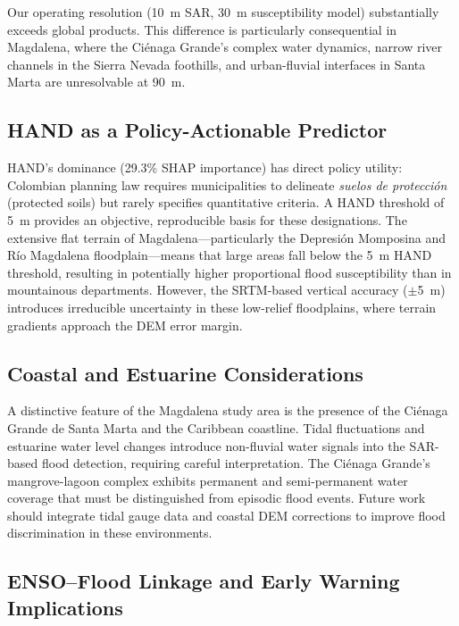 \documentclass{article}
\begin{document}
Our operating resolution (\SI{10}{\metre} SAR, \SI{30}{\metre} susceptibility model) substantially exceeds global products. This difference is particularly consequential in Magdalena, where the Ci\'enaga Grande's complex water dynamics, narrow river channels in the Sierra Nevada foothills, and urban-fluvial interfaces in Santa Marta are unresolvable at \SI{90}{\metre}.

\subsection{HAND as a Policy-Actionable Predictor}

HAND's dominance (29.3\% SHAP importance) has direct policy utility: Colombian planning law requires municipalities to delineate \textit{suelos de protecci\'on} (protected soils) but rarely specifies quantitative criteria. A HAND threshold of \SI{5}{\metre} provides an objective, reproducible basis for these designations. The extensive flat terrain of Magdalena---particularly the Depresi\'on Momposina and R\'io Magdalena floodplain---means that large areas fall below the \SI{5}{\metre} HAND threshold, resulting in potentially higher proportional flood susceptibility than in mountainous departments. However, the SRTM-based vertical accuracy ($\pm$\SI{5}{\metre}) introduces irreducible uncertainty in these low-relief floodplains, where terrain gradients approach the DEM error margin.

\subsection{Coastal and Estuarine Considerations}

A distinctive feature of the Magdalena study area is the presence of the Ci\'enaga Grande de Santa Marta and the Caribbean coastline. Tidal fluctuations and estuarine water level changes introduce non-fluvial water signals into the SAR-based flood detection, requiring careful interpretation. The Ci\'enaga Grande's mangrove-lagoon complex \citep{Botero2010, RiveraMonroy2006} exhibits permanent and semi-permanent water coverage that must be distinguished from episodic flood events. Future work should integrate tidal gauge data and coastal DEM corrections to improve flood discrimination in these environments.

\subsection{ENSO--Flood Linkage and Early Warning Implications}
\end{document}
